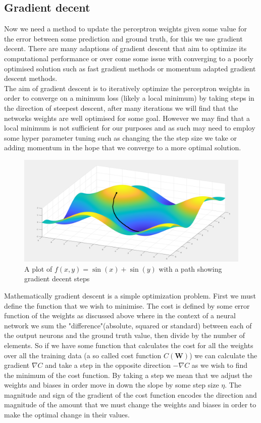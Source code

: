 \documentclass{article}
\begin{document}
\subsection{Gradient decent}
\label{sec:gradientDecent}
Now we need a method to update the perceptron weights given some value for the error between some prediction and ground truth, for this we use gradient decent. There are many adaptions of gradient descent that aim to optimize its computational performance or over come some issue with converging to a poorly optimised solution such as fast gradient methods or momentum adapted gradient descent methods. \\
The aim of gradient descent is to iteratively optimize the perceptron weights in order to converge on a minimum loss (likely a local minimum) by taking steps in the direction of steepest descent, after many iterations we will find that the networks weights are well optimised for some goal. However we may find that a local minimum is not sufficient for our purposes and as such may need to employ some hyper parameter tuning such as changing the the step size we take or adding momentum in the hope that we converge to a more optimal solution.
\begin{figure}[H]
\centering
\caption{A plot of $f(x,y) = \sin(x) + \sin(y)$ with a path showing gradient decent steps}
\includegraphics[scale=0.2]{mesh.png}
\end{figure}
Mathematically gradient descent is a simple optimization problem. First we must define the function that we wish to minimise. The cost is defined by some error function of the weights as discussed above where in the context of a neural network we sum the "difference"(absolute, squared or standard) between each of the output neurons and the ground truth value, then divide by the number of elements. So if we have some function that calculates the cost for all the weights over all the training data (a so called cost function $C(\mathbf{W})$) we can calculate the gradient $\nabla C$ and take a step in the opposite direction $-\nabla C$ as we wish to find the minimum of the cost function. By taking a step we mean that we adjust the weights and biases in order move in down the slope by some step size $\eta$. The magnitude and sign of the gradient of the cost function encodes the direction and magnitude of the amount that we must change the weights and biases in order to make the optimal change in their values. 
\end{document}
